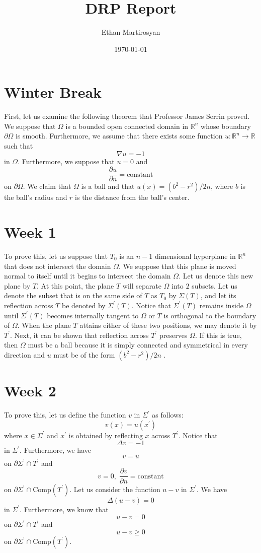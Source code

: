 \documentclass[12pt]{article}
\newcommand{\R}{\mathbb{R}}
\begin{document}
 
\title{DRP Report}
\author{Ethan Martirosyan}
\date{\today}
\maketitle
{}
\hfuzz=50pt
\section*{Winter Break}
First, let us examine the following theorem that Professor James Serrin proved. We suppose that $\Omega$ is a bounded open connected domain in $\R^n$ whose boundary $\partial{\Omega}$ is smooth. Furthermore, we assume that there exists some function $u: \R^n \rightarrow \R$ such that
\[
\nabla u = -1
\] in $\Omega$. Furthermore, we suppose that $u=0$ and 
\[
\frac{\partial{u}}{\partial{n}} = \text{constant}
\] on $\partial{\Omega}$. We claim that $\Omega$ is a ball and that $u(x) = (b^2-r^2)/2n$, where $b$ is the ball's radius and $r$ is the distance from the ball's center.
\section*{Week 1}
To prove this, let us suppose that $T_0$ is an $n-1$ dimensional hyperplane in $\R^n$ that does not intersect the domain $\Omega$. We suppose that this plane is moved normal to itself until it begins to intersect the domain $\Omega$. Let us denote this new plane by $T$. At this point, the plane $T$ will separate $\Omega$ into $2$ subsets. Let us denote the subset that is on the same side of $T$ as $T_0$ by $\Sigma(T)$, and let its reflection across $T$ be denoted by $\Sigma^\prime(T)$. Notice that $\Sigma^\prime(T)$ remains inside $\Omega$ until $\Sigma^\prime(T)$ becomes internally tangent to $\Omega$ or $T$ is orthogonal to the boundary of $\Omega$. When the plane $T$ attains either of these two positions, we may denote it by $T^\prime$. Next, it can be shown that reflection across $T^\prime$ preserves $\Omega$. If this is true, then $\Omega$ must be a ball because it is simply connected and symmetrical in every direction and $u$ must be of the form $(b^2-r^2)/2n$ \cite{serrin71}.
\section*{Week 2}
To prove this, let us define the function $v$ in $\Sigma^\prime$ as follows:
\[
v(x) = u(x^\prime)
\] where $x \in \Sigma^\prime$ and $x^\prime$ is obtained by reflecting $x$ across $T^\prime$. Notice that 
\[
\Delta v = -1
\] in $\Sigma^\prime$. Furthermore, we have
\[
v = u 
\] on $\partial{\Sigma^\prime} \cap T^\prime$ and
\[
v = 0, \; \frac{\partial{v}}{\partial{n}} = \text{constant} 
\] on $\partial{\Sigma^\prime} \cap \text{Comp}(T^\prime)$. Let us consider the function $u-v$ in $\Sigma^\prime$. We have
\[
\Delta(u-v) = 0
\] in $\Sigma^\prime$. Furthermore, we know that
\[
u - v = 0
\] on $\partial{\Sigma^\prime} \cap T^\prime$ and
\[
 u - v \geq 0 
\] on $\partial{\Sigma^\prime} \cap \text{Comp}(T^\prime)$. 
\end{document}
